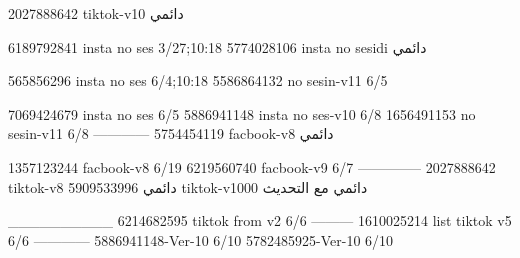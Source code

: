 2027888642 tiktok-v10
دائمي

6189792841 insta no ses
3/27;10:18
5774028106 insta no sesidi
دائمي

565856296 insta no ses
6/4;10:18
5586864132 no sesin-v11
6/5

7069424679 insta no ses
6/5
5886941148 insta no ses-v10
6/8
1656491153 no sesin-v11
6/8
------------
5754454119 facbook-v8
دائمي

1357123244 facbook-v8
6/19
6219560740 facbook-v9
6/7
--------------
2027888642 tiktok-v8
دائمي
5909533996 tiktok-v1000
دائمي مع التحديث

__________
6214682595 tiktok from v2
6/6
---------
1610025214 list tiktok v5
6/6
------------
5886941148-Ver-10
6/10
5782485925-Ver-10
6/10
